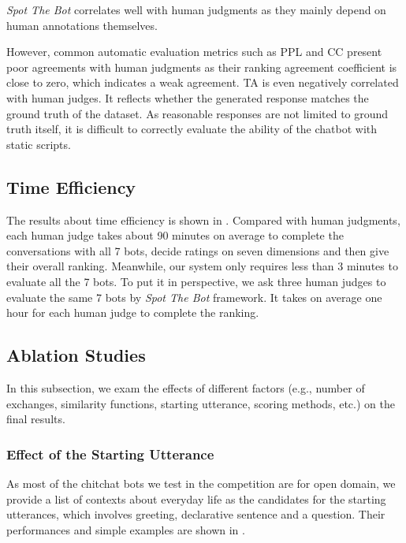 \textit{Spot The Bot} correlates well with human judgments as they
mainly depend on human annotations themselves. 

However, common automatic evaluation metrics such as PPL and CC 
present poor agreements with human judgments as their ranking 
agreement coefficient is close to zero,
which indicates a weak agreement.
TA is even negatively correlated with human judges. 
It reflects whether the generated response matches the ground truth of the dataset. As reasonable responses are not limited to ground truth itself,
 it is difficult to correctly evaluate the ability of the chatbot with static scripts.

\subsection{Time Efficiency}
\label{sec:time}
The results about time efficiency is shown in . 
Compared with human judgments, each human judge takes about 90 minutes on average to complete
the conversations with all 7 bots, decide ratings on seven dimensions and then give their overall ranking.
Meanwhile, our system only requires less than 3 minutes to evaluate all the 7 bots.
 To put it in perspective, we ask three human judges to evaluate the same
7 bots by \textit{Spot The Bot} framework. It takes on average one hour for
each human judge to complete the ranking.

\subsection{Ablation Studies}
\label{sec:ablation}
In this subsection, we exam the effects of different factors
(e.g., number of exchanges, similarity functions, starting utterance, 
scoring methods, etc.) on the final results. 
  

\subsubsection*{Effect of the Starting Utterance}

As most of the chitchat bots we test in the competition 
are for open domain, we provide a list of contexts about 
everyday life as the candidates for the starting utterances, 
which involves greeting, declarative sentence and a question.  
Their performances and simple examples are shown 
in .

